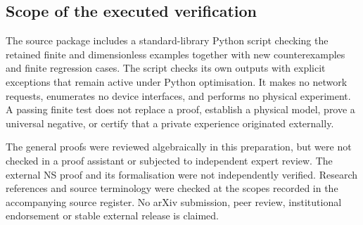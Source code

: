 \documentclass[11pt,a4paper]{article}
\theoremstyle{definition}
\theoremstyle{remark}
\begin{document}
\subsection{Scope of the executed verification}
The source package includes a standard-library Python script checking the retained finite and dimensionless examples together with new counterexamples and finite regression cases. The script checks its own outputs with explicit exceptions that remain active under Python optimisation. It makes no network requests, enumerates no device interfaces, and performs no physical experiment. A passing finite test does not replace a proof, establish a physical model, prove a universal negative, or certify that a private experience originated externally.

The general proofs were reviewed algebraically in this preparation, but were not checked in a proof assistant or subjected to independent expert review. The external NS proof and its formalisation were not independently verified. Research references and source terminology were checked at the scopes recorded in the accompanying source register. No arXiv submission, peer review, institutional endorsement or stable external release is claimed.


\clearpage
\end{document}

